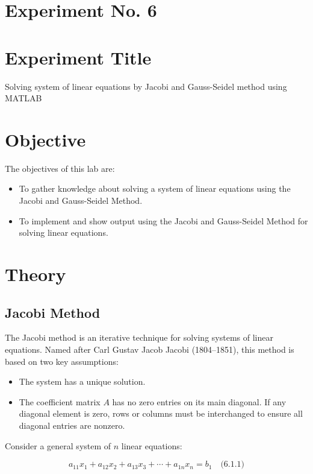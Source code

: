 \documentclass[a4paper,12pt]{article}
\begin{document}
	\section{Experiment No. 6}
	
	\section{Experiment Title }
	Solving system of linear equations by Jacobi and Gauss-Seidel method using MATLAB
	\section{Objective}
	
	The objectives of this lab are:
	\begin{itemize}
		\item To gather knowledge about solving a system of linear equations using the Jacobi and Gauss-Seidel Method.
	\item To implement and show output using the  Jacobi and Gauss-Seidel Method for solving linear equations.
	
	\end{itemize}

\section{Theory}

\subsection{Jacobi Method}

The Jacobi method is an iterative technique for solving systems of linear equations. Named after Carl Gustav Jacob Jacobi (1804–1851), this method is based on two key assumptions:

\begin{itemize}
	\item The system has a unique solution.
	\item The coefficient matrix $A$ has no zero entries on its main diagonal. If any diagonal element is zero, rows or columns must be interchanged to ensure all diagonal entries are nonzero.
\end{itemize}

Consider a general system of $n$ linear equations:

$$
a_{11}x_1 + a_{12}x_2 + a_{13}x_3 + \cdots + a_{1n}x_n = b_1 \quad \text{(6.1.1)}
$$
\end{document}
